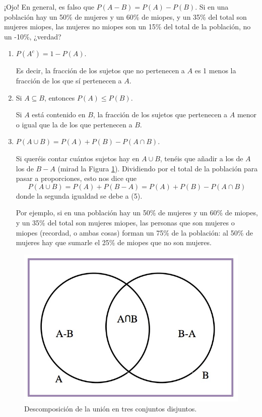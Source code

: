 \documentclass[
]{book}
\theoremstyle{definition}
\theoremstyle{definition}
\theoremstyle{definition}
\theoremstyle{definition}
\theoremstyle{remark}
\begin{document}
\begin{rmdcaution}
¡Ojo! En general, es falso que \(P(A-B)=P(A)-P(B)\). Si en una población hay un 50\% de mujeres y un 60\% de miopes, y un 35\% del total son mujeres miopes, las mujeres no miopes son un 15\% del total de la población, no un -10\%, ¿verdad?
\end{rmdcaution}

\begin{enumerate}
\def\labelenumi{\arabic{enumi}.}
\setcounter{enumi}{5}
\item
  \(P(A^c)=1-P(A)\).

  Es decir, la fracción de los sujetos que no pertenecen a \(A\) es 1 menos la fracción de los que sí pertenecen a \(A\).
\item
  Si \(A\subseteq B\), entonces \(P(A)\leqslant P(B)\).

  Si \(A\) está contenido en \(B\), la fracción de los sujetos que pertenecen a \(A\) menor o igual que la de los que pertenecen a \(B\).
\item
  \(P(A\cup B)=P(A)+P(B)-P(A \cap B)\).

  Si queréis contar cuántos sujetos hay en \(A\cup B\), tenéis que añadir a los de \(A\) los de \(B-A\) (mirad la Figura \ref{fig:AmenysB}). Dividiendo por el total de la población para pasar a proporciones, esto nos dice que
  \[
  P(A\cup B)=P(A)+P(B-A)=P(A)+P(B)-P(A \cap B)
  \]
  donde la segunda igualdad se debe a (5).

  Por ejemplo, si en una población hay un 50\% de mujeres y un 60\% de miopes, y un 35\% del total son mujeres miopes, las personas que son mujeres o miopes (recordad, o ambas cosas) forman un 75\% de la población: al 50\% de mujeres hay que sumarle el 25\% de miopes que no son mujeres.
\end{enumerate}

\begin{figure}

{\centering \includegraphics[width=0.5\linewidth]{INREMDN_files/figure-html/A-B} 

}

\caption{Descomposición de la unión en tres conjuntos disjuntos.}\label{fig:AmenysB}
\end{figure}
\end{document}

